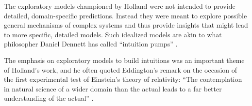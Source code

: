 \documentclass{sig-alternate}
\begin{document}

The exploratory models championed by Holland were not intended to
provide detailed, domain-specific predictions.  Instead they were
meant to explore possible general mechanisms of complex systems and
thus provide insights that might lead to more specific, detailed
models.  Such idealized models are akin to what philosopher Daniel Dennett has called
``intuition pumps'' \cite{Dennett1984}.

The emphasis on exploratory models to build intuitions was an
important theme of Holland's work, and he often quoted Eddington's
remark on the occasion of the first experimental test of Einstein's
theory of relativity: ``The contemplation in natural science of a wider
domain than the actual leads to a far better understanding of the
actual'' \cite{Eddington1927}.



\end{document}
